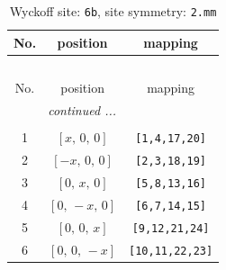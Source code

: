 \documentclass[fleqn,8pt]{jsarticle}
\begin{document}
\renewcommand{\arraystretch}{1.2}
\begin{longtable}{ccc}
\caption{Wyckoff site: {\tt 6b}, site symmetry: {\tt 2.mm}}
 \\
 \hline \hline
No. & position & mapping \\ \hline \endfirsthead

\multicolumn{2}{l}{\tablename\ \thetable{}} \\
 \hline \hline
No. & position & mapping \\ \hline \endhead

 \hline \hline
\multicolumn{2}{r}{\footnotesize\it continued ...} \\ \endfoot

 \hline \hline
\multicolumn{2}{r}{} \\ \endlastfoot

1 & $\left[ x,\, 0,\, 0 \right]$ & {\tt [1,4,17,20]} \\ \hline
2 & $\left[ - x,\, 0,\, 0 \right]$ & {\tt [2,3,18,19]} \\ \hline
3 & $\left[ 0,\, x,\, 0 \right]$ & {\tt [5,8,13,16]} \\ \hline
4 & $\left[ 0,\, - x,\, 0 \right]$ & {\tt [6,7,14,15]} \\ \hline
5 & $\left[ 0,\, 0,\, x \right]$ & {\tt [9,12,21,24]} \\ \hline
6 & $\left[ 0,\, 0,\, - x \right]$ & {\tt [10,11,22,23]} \\
\end{longtable}
\renewcommand{\arraystretch}{1.2}
\end{document}
